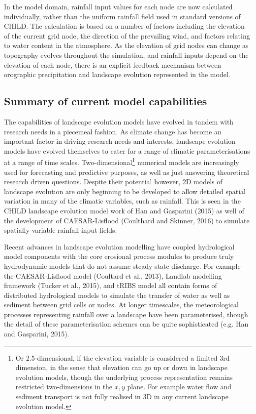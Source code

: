 In the model domain, rainfall input values for each node are now calculated individually, rather than the uniform rainfall field used in standard versions of CHILD. The calculation is based on a number of factors including the elevation of the current grid node, the direction of the prevailing wind, and factors relating to water content in the atmosphere. As the elevation of grid nodes can change as topography evolves throughout the simulation, and rainfall inputs depend on the elevation of each node, there is an explicit feedback mechanism between orographic precipitation and landscape evolution represented in the model. 

\subsection{Summary of current model capabilities}

The capabilities of landscape evolution models have evolved in tandem with research needs in a piecemeal fashion. As climate change has become an important factor in driving research needs and interests, landscape evolution models have evolved themselves to cater for a range of climatic parameterisations at a range of time scales. Two-dimensional\footnote{Or 2.5-dimensional, if the elevation variable is considered a limited 3rd dimension, in the sense that elevation can go up or down in landscape evolution models, though the underlying process representation remains restricted two-dimensions in the \(x,y\) plane. For example water flow and sediment transport is not fully realised in 3D in any current landscape evolution model.} numerical models are increasingly used for forecasting and predictive purposes, as well as just answering theoretical research driven questions. Despite their potential however, 2D models of landscape evolution are only beginning to be developed to allow detailed spatial variation in many of the climatic variables, such as rainfall. This is seen in the CHILD landscape evolution model work of Han and Gasparini (2015) as well of the development of CAESAR-Lisflood (Coulthard and Skinner, 2016) to simulate spatially variable rainfall input fields. 

Recent advances in landscape evolution modelling have coupled hydrological model components with the core erosional process modules to produce truly hydrodynamic models that do not assume steady state discharge. For example the CAESAR-Lisflood model (Coultard et al., 2013), Landlab modelling framework (Tucker et al., 2015), and tRIBS model \citep{vivoni2011real} all contain forms of distributed hydrological models to simulate the transfer of water as well as sediment between grid cells or nodes. At longer timescales, the meteorological processes representing rainfall over a landscape have been parameterised, though the detail of these parameterisation schemes can be quite sophisticated (e.g. Han and Gasparini, 2015).

